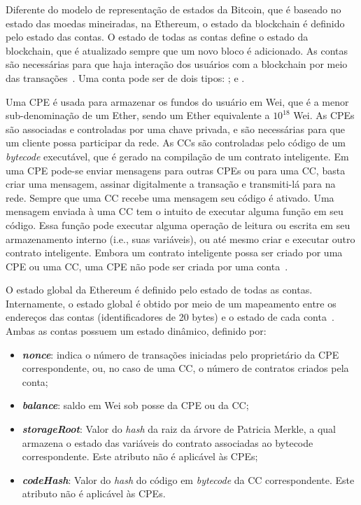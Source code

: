 Diferente do modelo de representação de estados da Bitcoin, que é baseado no estado das moedas mineiradas, na Ethereum, o estado da blockchain é definido pelo estado das contas. O estado de todas as contas define o estado da blockchain, que é atualizado sempre que um novo bloco é adicionado. As contas são necessárias para que haja interação dos usuários com a blockchain por meio das transações~\cite{ethereum-homestead2020documentation}. Uma conta pode ser de dois tipos: ; e . 

Uma CPE é usada para armazenar os fundos do usuário em Wei, que é a menor sub-denominação de um Ether, sendo um Ether equivalente a $10^{18}$ Wei. As CPEs são associadas e controladas por uma chave privada, e são necessárias para que um cliente possa participar da rede. As CCs são controladas pelo código de um \textit{bytecode} executável, que é gerado na compilação de um contrato inteligente. Em uma CPE pode-se enviar mensagens para outras CPEs ou para uma CC, basta criar uma mensagem, assinar digitalmente a transação e transmiti-lá para na rede. Sempre que uma CC recebe uma mensagem seu código é ativado. Uma mensagem enviada à uma CC tem o intuito de executar alguma função em seu código. Essa função pode executar alguma operação de leitura ou escrita em seu armazenamento interno (i.e., suas variáveis), ou até mesmo criar e executar outro contrato inteligente. Embora um contrato inteligente possa ser criado por uma CPE ou uma CC, uma CPE não pode ser criada por uma conta~\cite{ethereum2014whitepaper, chen2020survey-ethereum-acm}. 

O estado global da Ethereum é definido pelo estado de todas as contas. Internamente, o estado global é obtido por meio de um mapeamento entre os endereços das contas (identificadores de 20 bytes) e o estado de cada conta~\cite{wood2014ethereum-yellow-paper}. Ambas as contas possuem um estado dinâmico, definido por: 
\begin{itemize}
    \item \textbf{\textit{nonce}}: indica o número de transações iniciadas pelo proprietário da CPE correspondente, ou, no caso de uma CC, o número de contratos criados pela conta;
    \item \textbf{\textit{balance}}: saldo em Wei sob posse da CPE ou da CC;
    \item \textbf{\textit{storageRoot}}: Valor do \textit{hash} da raiz da árvore de Patricia Merkle, a qual armazena o estado das variáveis do contrato associadas ao bytecode correspondente. Este atributo não é aplicável às CPEs;
    \item \textbf{\textit{codeHash}}: Valor do \textit{hash} do código em \textit{bytecode} da CC correspondente. Este atributo não é aplicável às CPEs.
\end{itemize}

